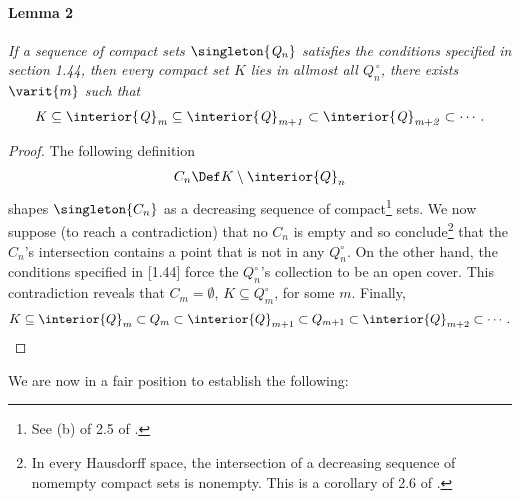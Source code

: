 \paragraph{Lemma 2}{ \it \label{1.16 Lemma 2}
If a sequence of compact sets $\mathit{\singleton{Q_n}}$ satisfies the conditions 
specified in section 1.44, then every compact set $K$ lies in allmost all 
%
  $\mathit{Q^{\,\circ}_n}$, \ie
%
there exists $\varit{m}$ such that 
%
  \begin{align}\mathit{
    K \subseteq 
    \interior{Q}_m 
      \subseteq 
    \interior{Q}_{m+1}
      \subset
    \interior{Q}_{m+2}
      \subset
    \cdots.}
  \end{align}
}
%
\begin{proof}
The following definition
%
  \begin{align}
    C_n \Def K \setminus \interior{Q}_n 
  \end{align}
%
shapes $\singleton{C_n}$ as a decreasing sequence of compact\footnote{
  See (b) of 2.5 of \cite{BigRudin}.
} 
sets. We now suppose (to reach a contradiction) that 
% 
  no $C_n$ is empty 
% 
and so conclude\footnote{
  In every Hausdorff space, the intersection of a decreasing sequence of %
  nomempty compact sets is nonempty. %
  This is a corollary of 2.6 of \cite{BigRudin}.
} 
that the $C_n$'s intersection contains a point that is not in any $Q^\circ_n$. 
On the other hand, the conditions specified in [1.44] force the 
% 
  $Q^\circ_n$'s collection  
%
to be an open cover.
% 
This contradiction reveals that 
%
  $C_m = \emptyset$, 
    \ie 
  $K \subseteq Q^\circ_m$, 
%  
for some $m$.
%
Finally,  
%
  \begin{align}
    K\subseteq 
    \interior{Q}_m
      \subset
    Q_m
      \subset
    \interior{Q}_{m+1}
      \subset
    Q_{m +1}
      \subset
    \interior{Q}_{m+2}
      \subset
    \cdots.
  \end{align}  
%
\end{proof}
\noindent We are now in a fair position to establish the following:
